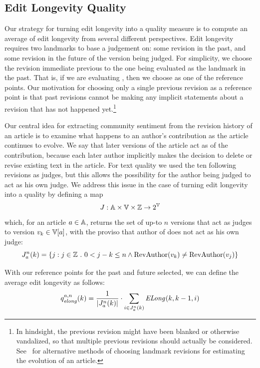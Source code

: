 \subsection{Edit Longevity Quality}

Our strategy for turning edit longevity into a quality measure
is to compute an average of edit longevity from several different
perspectives.
Edit longevity requires two landmarks to base a judgement on:
some revision in the past, and some revision in the future of
the version being judged.
For simplicity, we choose the revision immediate previous to
the one being evaluated as the landmark in the past.
That is, if we are evaluating , then we choose
 as one of the reference points.
Our motivation for choosing only a single previous revision
as a reference point is that past revisions cannot be making
any implicit statements about a revision that has not happened
yet.\footnote{In hindsight, the previous revision might have been
blanked or otherwise vandalized, so that multiple previous revisions
should actually be considered.
See~\cite{Chatterjee2008} for alternative methods of choosing
landmark revisions for estimating the evolution of an article.}

Our central idea for extracting community sentiment from the
revision history of an article is to examine what happens to an
author's contribution as the article continues to evolve.
We say that later versions of the article act as 
of the contribution, because each later author implicitly makes
the decision to delete or revise existing text in the article.
For text quality we used the ten following revisions as judges,
but this allows the possibility for the author being judged
to act as his own judge.
We address this issue in the case of turning edit longevity into
a quality by defining a map
\begin{equation*}
J : \articles \times \versions{} \times \mathbb{Z} \to 2^\versions{}
\end{equation*}
which, for an article $a \in \mathbb{A}$,
returns the set of up-to $n$ versions that act as judges
to version $\version{k} \in \versions{a}$, with the proviso
that author of  does not act as his own judge:
\begin{equation}
\judges{a}{n}{k} = \{ j : j \in \mathbb{Z}~.~0 < j - k \le n
    \wedge \revauthor{\version{k}} \ne \revauthor{\version{j}} \}
\label{def:judges}
\end{equation}

With our reference points for the past and future selected, we
can define the average edit longevity as follows:
\begin{equation}
\quality{elong}{a,n}{k} = \frac{1}{|\judges{a}{n}{k}|} \cdot
      \sum_{i \in \judges{a}{n}{k}} \esurv{}{k,k-1,i}
\label{def:elong}
\end{equation}

